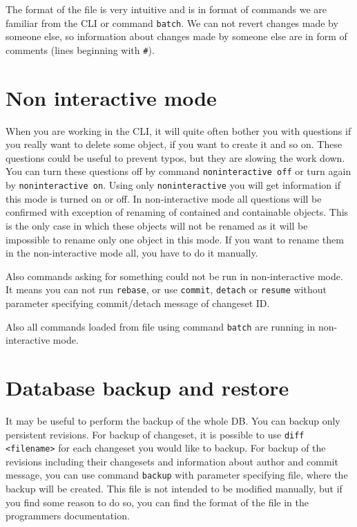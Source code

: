 \documentclass[deska]{subfiles}
\begin{document}
The format of the file is very intuitive and is in format of commands we are familiar from the CLI or command {\tt batch}.
We can not revert changes made by someone else, so information about changes made by someone else are in form of comments
(lines beginning with {\tt \#}).

\section{Non interactive mode}

When you are working in the CLI, it will quite often bother you with questions if you really want to delete some object,
if you want to create it and so on. These questions could be useful to prevent typos, but they are slowing the work down.
You can turn these questions off by command {\tt noninteractive off} or turn again by {\tt noninteractive on}. Using
only {\tt noninteractive} you will get information if this mode is turned on or off. In non-interactive mode all
questions will be confirmed with exception of renaming of contained and containable objects. This is the only case in
which these objects will not be renamed as it will be impossible to rename only one object in this mode. If you want to
rename them in the non-interactive mode all, you have to do it manually.

Also commands asking for something could not be run in non-interactive mode. It means you can not run {\tt rebase}, or use
{\tt commit}, {\tt detach} or {\tt resume} without parameter specifying commit/detach message of changeset ID.

Also all commands loaded from file using command {\tt batch} are running in non-interactive mode.

\section{Database backup and restore}
\label{sec:cli-db-backup}

It may be useful to perform the backup of the whole DB. You can backup only persistent revisions. For backup of
changeset, it is possible to use {\tt diff <filename>} for each changeset you would like to backup. For backup of the
revisions including their changesets and information about author and commit message, you can use command {\tt backup}
with parameter specifying file, where the backup will be created. This file is not intended to be modified manually,
but if you find some reason to do so, you can find the format of the file in the programmers documentation.
\end{document}
